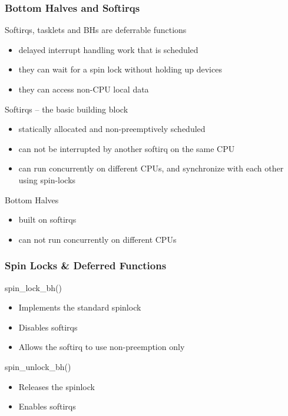 \begin{frame}[fragile]
    \frametitle{Bottom Halves and Softirqs}
    \Large
    Softirqs, tasklets and BHs are deferrable functions
    \large
    \begin{itemize}
       \item delayed interrupt handling work that is scheduled
       \item they can wait for a spin lock without holding up devices
       \item they can access non-CPU local data
    
    \end{itemize}
\Large
    Softirqs – the basic building block
    \large
    \begin{itemize}
        \item statically allocated and non-preemptively scheduled
\item  can not be interrupted by another softirq on the same CPU
\item can run concurrently on different CPUs, and synchronize with
each other using spin-locks
    \end{itemize}
\Large
    Bottom Halves
    \large
\begin{itemize}
    \item built on softirqs
    \item can not run concurrently on different CPUs
\end{itemize}
    
\end{frame}


\begin{frame}[fragile]
    \frametitle{Spin Locks \& Deferred Functions}
    \Large
    spin\_lock\_bh()
    
    \large
    \begin{itemize}
        \item Implements the standard spinlock
        \item Disables softirqs
        \item Allows the softirq to use non-preemption only
    \end{itemize}
    \Large
    spin\_unlock\_bh()
    \large
    \begin{itemize}
        \item Releases the spinlock
        \item Enables softirqs
    \end{itemize}

\end{frame}


